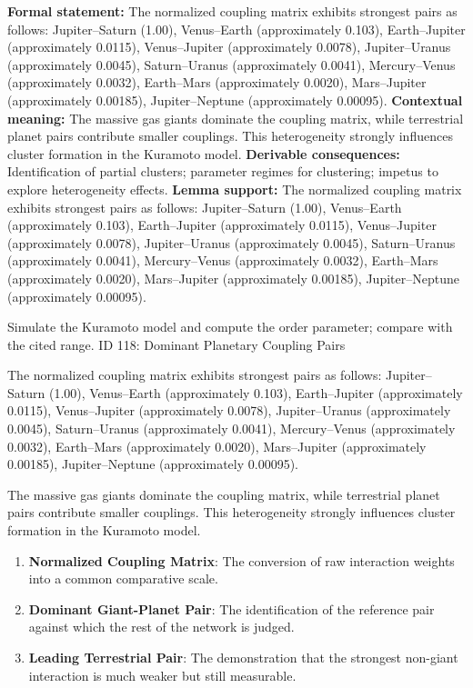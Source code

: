 \begingroup\footnotesize\setlength{\emergencystretch}{3em}\sloppy
\textbf{Formal statement:} The normalized coupling matrix exhibits strongest pairs as follows: Jupiter--Saturn (1.00), Venus--Earth (approximately 0.103), Earth--Jupiter (approximately 0.0115), Venus--Jupiter (approximately 0.0078), Jupiter--Uranus (approximately 0.0045), Saturn--Uranus (approximately 0.0041), Mercury--Venus (approximately 0.0032), Earth--Mars (approximately 0.0020), Mars--Jupiter (approximately 0.00185), Jupiter--Neptune (approximately 0.00095).
\textbf{Contextual meaning:} The massive gas giants dominate the coupling matrix, while terrestrial planet pairs contribute smaller couplings. This heterogeneity strongly influences cluster formation in the Kuramoto model.
\textbf{Derivable consequences:} Identification of partial clusters; parameter regimes for clustering; impetus to explore heterogeneity effects.
\textbf{Lemma support:} The normalized coupling matrix exhibits strongest pairs as follows: Jupiter--Saturn (1.00), Venus--Earth (approximately 0.103), Earth--Jupiter (approximately 0.0115), Venus--Jupiter (approximately 0.0078), Jupiter--Uranus (approximately 0.0045), Saturn--Uranus (approximately 0.0041), Mercury--Venus (approximately 0.0032), Earth--Mars (approximately 0.0020), Mars--Jupiter (approximately 0.00185), Jupiter--Neptune (approximately 0.00095).\par
\endgroup

Simulate the Kuramoto model and compute the order parameter; compare with the cited range. ID 118: Dominant Planetary Coupling Pairs

The normalized coupling matrix exhibits strongest pairs as follows: Jupiter--Saturn (1.00), Venus--Earth (approximately 0.103), Earth--Jupiter (approximately 0.0115), Venus--Jupiter (approximately 0.0078), Jupiter--Uranus (approximately 0.0045), Saturn--Uranus (approximately 0.0041), Mercury--Venus (approximately 0.0032), Earth--Mars (approximately 0.0020), Mars--Jupiter (approximately 0.00185), Jupiter--Neptune (approximately 0.00095).

The massive gas giants dominate the coupling matrix, while terrestrial planet pairs contribute smaller couplings. This heterogeneity strongly influences cluster formation in the Kuramoto model.
\endgroup

\begin{enumerate}[leftmargin=1.6em,itemsep=6pt,topsep=4pt]
\item \textbf{Normalized Coupling Matrix}: The conversion of raw interaction weights into a common comparative scale.
\item \textbf{Dominant Giant-Planet Pair}: The identification of the reference pair against which the rest of the network is judged.
\item \textbf{Leading Terrestrial Pair}: The demonstration that the strongest non-giant interaction is much weaker but still measurable.
\end{enumerate}

